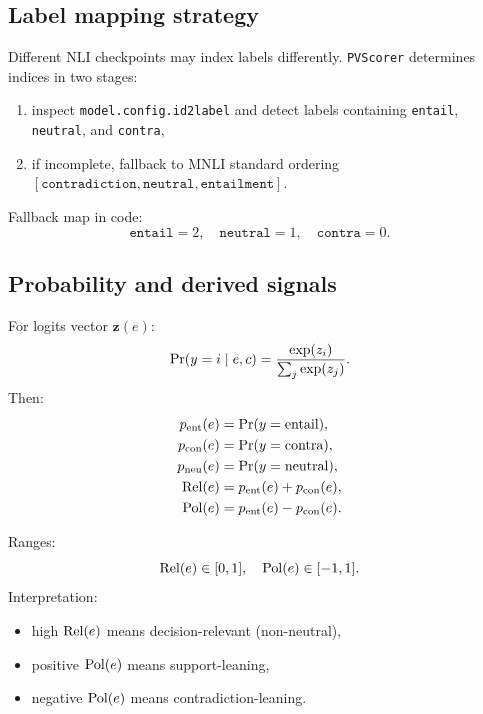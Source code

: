 \subsection{Label mapping strategy}
Different NLI checkpoints may index labels differently.
\texttt{PVScorer} determines indices in two stages:
\begin{enumerate}
\item inspect \texttt{model.config.id2label} and detect labels containing
\texttt{entail}, \texttt{neutral}, and \texttt{contra},
\item if incomplete, fallback to MNLI standard ordering
\([\texttt{contradiction},\texttt{neutral},\texttt{entailment}]\).
\end{enumerate}
Fallback map in code:
\begin{equation}
\texttt{entail}=2,\quad \texttt{neutral}=1,\quad \texttt{contra}=0.
\end{equation}

\subsection{Probability and derived signals}
For logits vector $\mathbf{z}(e)$:
\begin{equation}
\Pr(y=i \mid e,c)=\frac{\exp(z_i)}{\sum_j \exp(z_j)}.
\end{equation}
Then:
\begin{align}
p_{\mathrm{ent}}(e) &= \Pr(y=\text{entail}), \\
p_{\mathrm{con}}(e) &= \Pr(y=\text{contra}), \\
p_{\mathrm{neu}}(e) &= \Pr(y=\text{neutral}), \\
\operatorname{Rel}(e) &= p_{\mathrm{ent}}(e)+p_{\mathrm{con}}(e), \\
\operatorname{Pol}(e) &= p_{\mathrm{ent}}(e)-p_{\mathrm{con}}(e).
\end{align}

Ranges:
\begin{equation}
\operatorname{Rel}(e)\in[0,1],\quad \operatorname{Pol}(e)\in[-1,1].
\end{equation}
Interpretation:
\begin{itemize}
\item high $\operatorname{Rel}(e)$ means decision-relevant (non-neutral),
\item positive $\operatorname{Pol}(e)$ means support-leaning,
\item negative $\operatorname{Pol}(e)$ means contradiction-leaning.
\end{itemize}

